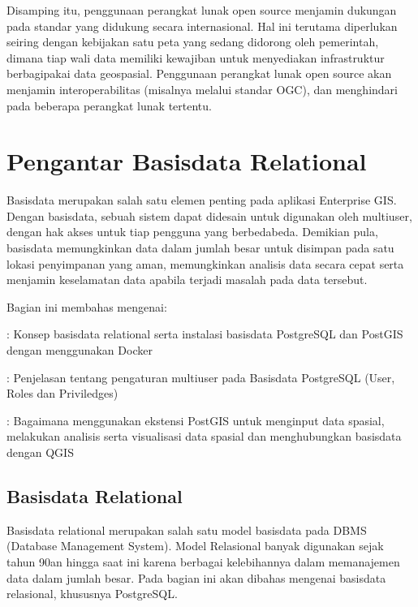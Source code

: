 \documentclass[letterpaper,10pt,english]{sphinxmanual}
\begin{document}
Disamping itu, penggunaan perangkat lunak open source menjamin dukungan pada standar yang didukung secara internasional. Hal ini terutama diperlukan seiring dengan kebijakan satu peta yang sedang didorong oleh pemerintah, dimana tiap wali data memiliki kewajiban untuk menyediakan infrastruktur berbagi\sphinxhyphen{}pakai data geospasial. Penggunaan perangkat lunak open source akan menjamin interoperabilitas (misalnya melalui standar OGC), dan menghindari  pada beberapa perangkat lunak tertentu.


\chapter{Pengantar Basisdata Relational}
\label{\detokenize{sesi2/intrordbms:pengantar-basisdata-relational}}\label{\detokenize{sesi2/intrordbms::doc}}
Basisdata merupakan salah satu elemen penting pada aplikasi Enterprise GIS. Dengan basisdata, sebuah sistem dapat didesain untuk digunakan oleh multi\sphinxhyphen{}user, dengan hak akses untuk tiap pengguna yang berbeda\sphinxhyphen{}beda. Demikian pula, basisdata memungkinkan data dalam jumlah besar untuk disimpan pada satu lokasi penyimpanan yang aman, memungkinkan analisis data secara cepat serta menjamin keselamatan data apabila terjadi masalah pada data tersebut.

Bagian ini membahas mengenai:

 {\hyperref[\detokenize{sesi2/relationaldb::doc}]{}}
: Konsep basisdata relational serta instalasi basisdata PostgreSQL dan PostGIS dengan menggunakan Docker

 {\hyperref[\detokenize{sesi2/dbmanagement::doc}]{}}
: Penjelasan tentang pengaturan multi\sphinxhyphen{}user pada Basisdata PostgreSQL (User, Roles dan Priviledges)

 {\hyperref[\detokenize{sesi2/postgisquery::doc}]{}}
: Bagaimana menggunakan ekstensi PostGIS untuk menginput data spasial, melakukan analisis serta visualisasi data spasial dan menghubungkan basisdata dengan QGIS






\section{Basisdata Relational}
\label{\detokenize{sesi2/relationaldb:basisdata-relational}}\label{\detokenize{sesi2/relationaldb::doc}}
Basisdata relational merupakan salah satu model basisdata pada DBMS (Database Management System). Model Relasional banyak digunakan sejak tahun 90an hingga saat ini karena berbagai kelebihannya dalam memanajemen data dalam jumlah besar. Pada bagian ini akan dibahas mengenai basisdata relasional, khususnya PostgreSQL.
\end{document}
